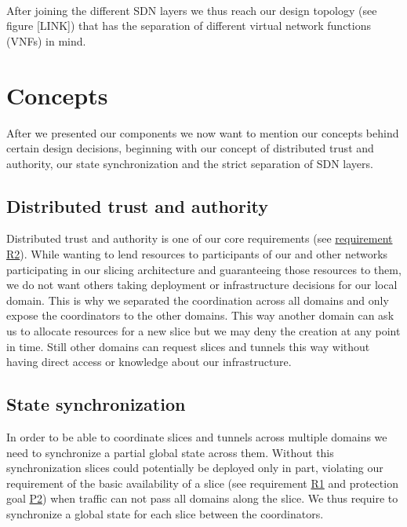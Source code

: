 
\paragraph{} After joining the different SDN layers we thus reach our design topology (see figure [LINK]) that has the separation of different virtual network functions (VNFs) in mind.


\section{Concepts}
\label{design_concepts}
After we presented our components we now want to mention our concepts behind certain design decisions, beginning with our concept of distributed trust and authority, our state synchronization and the strict separation of SDN layers.

\subsection{Distributed trust and authority}
Distributed trust and authority is one of our core requirements (see \hyperref[R2]{requirement R2}). While wanting to lend resources to participants of our and other networks participating in our slicing architecture and guaranteeing those resources to them, we do not want others taking deployment or infrastructure decisions for our local domain. This is why we separated the coordination across all domains and only expose the coordinators to the other domains. This way another domain can ask us to allocate resources for a new slice but we may deny the creation at any point in time. Still other domains can request slices and tunnels this way without having direct access or knowledge about our infrastructure.

\subsection{State synchronization}
In order to be able to coordinate slices and tunnels across multiple domains we need to synchronize a partial global state across them. Without this synchronization slices could potentially be deployed only in part, violating our requirement of the basic availability of a slice (see requirement \hyperref[R1]{R1} and protection goal \hyperref[P2]{P2}) when traffic can not pass all domains along the slice. We thus require to synchronize a global state for each slice between the coordinators.

